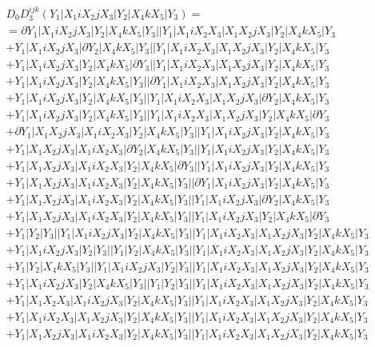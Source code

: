 \documentclass{article}[12pt]
\begin{document}
\begin{align*}
& D_0 D_3^{ijk}(Y_1|X_1iX_2jX_3|Y_2|X_4kX_5|Y_3) =\\
& =\partial Y_1|X_1iX_2jX_3|Y_2|X_4kX_5|Y_3||Y_1|X_1iX_2X_3|X_1X_2jX_3|Y_2|X_4kX_5|Y_3\\ 
& +Y_1|X_1iX_2jX_3|\partial Y_2|X_4kX_5|Y_3||Y_1|X_1iX_2X_3|X_1X_2jX_3|Y_2|X_4kX_5|Y_3\\ 
& +Y_1|X_1iX_2jX_3|Y_2|X_4kX_5|\partial Y_3||Y_1|X_1iX_2X_3|X_1X_2jX_3|Y_2|X_4kX_5|Y_3\\ 
& +Y_1|X_1iX_2jX_3|Y_2|X_4kX_5|Y_3||\partial Y_1|X_1iX_2X_3|X_1X_2jX_3|Y_2|X_4kX_5|Y_3\\ 
& +Y_1|X_1iX_2jX_3|Y_2|X_4kX_5|Y_3||Y_1|X_1iX_2X_3|X_1X_2jX_3|\partial Y_2|X_4kX_5|Y_3\\ 
& +Y_1|X_1iX_2jX_3|Y_2|X_4kX_5|Y_3||Y_1|X_1iX_2X_3|X_1X_2jX_3|Y_2|X_4kX_5|\partial Y_3\\  
& +\partial Y_1|X_1X_2jX_3|X_1iX_2X_3|Y_2|X_4kX_5|Y_3||Y_1|X_1iX_2jX_3|Y_2|X_4kX_5|Y_3\\
& +Y_1|X_1X_2jX_3|X_1iX_2X_3|\partial Y_2|X_4kX_5|Y_3||Y_1|X_1iX_2jX_3|Y_2|X_4kX_5|Y_3\\ 
& +Y_1|X_1X_2jX_3|X_1iX_2X_3|Y_2|X_4kX_5|\partial Y_3||Y_1|X_1iX_2jX_3|Y_2|X_4kX_5|Y_3\\
& +Y_1|X_1X_2jX_3|X_1iX_2X_3|Y_2|X_4kX_5|Y_3||\partial Y_1|X_1iX_2jX_3|Y_2|X_4kX_5|Y_3\\
& +Y_1|X_1X_2jX_3|X_1iX_2X_3|Y_2|X_4kX_5|Y_3||Y_1|X_1iX_2jX_3|\partial Y_2|X_4kX_5|Y_3\\
& +Y_1|X_1X_2jX_3|X_1iX_2X_3|Y_2|X_4kX_5|Y_3||Y_1|X_1iX_2jX_3|Y_2|X_4kX_5|\partial Y_3\\
 & +Y_1|Y_2|Y_3||Y_1|X_1iX_2jX_3|Y_2|X_4kX_5|Y_3||Y_1|X_1iX_2X_3|X_1X_2jX_3|Y_2|X_4kX_5|Y_3\\ 
 & +Y_1|X_1iX_2jX_3|Y_2|Y_3||Y_1|Y_2|X_4kX_5|Y_3||Y_1|X_1iX_2X_3|X_1X_2jX_3|Y_2|X_4kX_5|Y_3\\ 
 & +Y_1|Y_2|X_4kX_5|Y_3||Y_1|X_1iX_2jX_3|Y_2|Y_3||Y_1|X_1iX_2X_3|X_1X_2jX_3|Y_2|X_4kX_5|Y_3\\ 
 & +Y_1|X_1iX_2jX_3|Y_2|X_4kX_5|Y_3||Y_1|Y_2|Y_3||Y_1|X_1iX_2X_3|X_1X_2jX_3|Y_2|X_4kX_5|Y_3\\ 
 & +Y_1|X_1X_2X_3|X_1iX_2jX_3|Y_2|X_4kX_5|Y_3||Y_1|X_1iX_2X_3|X_1X_2jX_3|Y_2|X_4kX_5|Y_3\\ 
 & +Y_1|X_1iX_2X_3|X_1X_2jX_3|Y_2|X_4kX_5|Y_3||Y_1|X_1iX_2X_3|X_1X_2jX_3|Y_2|X_4kX_5|Y_3\\ 
 & +Y_1|X_1X_2jX_3|X_1iX_2X_3|Y_2|X_4kX_5|Y_3||Y_1|X_1iX_2X_3|X_1X_2jX_3|Y_2|X_4kX_5|Y_3\\ 

\end{align*}
\end{document}
